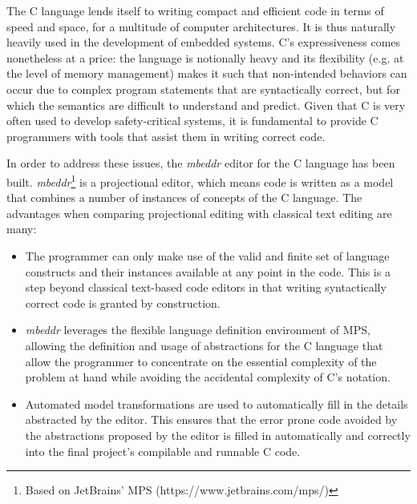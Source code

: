 The C language lends itself to writing compact and efficient code in terms of
speed and space, for a multitude of computer architectures. It is thus naturally
heavily used in the development of embedded systems. C’s expressiveness comes
nonetheless at a price: the language is notionally heavy and its flexibility
(e.g. at the level of memory management) makes it such that non-intended
behaviors can occur due to complex program statements that are syntactically
correct, but for which the semantics are difficult to understand and predict.
Given that C is very often used to develop safety-critical systems, it is
fundamental to provide C programmers with tools that assist them in writing
correct code.

In order to address these issues, the \emph{mbeddr} editor for the C language has been
built\cite{SzaboVKRS14}. \emph{mbeddr}\footnote{Based on JetBrains’ MPS
(https://www.jetbrains.com/mps/)} is a projectional editor, which means code is
written as a model that combines a number of instances of concepts of the C
language. The advantages when comparing projectional editing with classical text
editing are many:

\begin{itemize}
  \item The programmer can only make use of the valid and finite set of language
  constructs and their instances available at any point in the code. This is a
  step beyond classical text-based code editors in that writing syntactically
  correct code is granted by construction.
  \item \emph{mbeddr} leverages the flexible language definition environment of MPS,
  allowing the definition and usage of abstractions for the C language that
  allow the programmer to concentrate on the essential complexity of the problem
  at hand while avoiding the accidental complexity of C’s notation.
  \item Automated model transformations are used to automatically fill in the
  details abstracted by the editor. This ensures that the error prone code
  avoided by the abstractions proposed by the editor is filled in automatically
  and correctly into the final project’s compilable and runnable C code.
\end{itemize}
